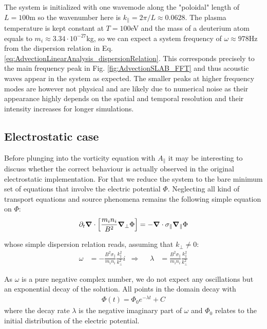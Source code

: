 The system is initialized with one wavemode along the "poloidal" length of $L=100$m so the wavenumber here is $k_\parallel = 2\pi / L \approx 0.0628$. The plasma temperature is kept constant at $T = 100$eV and the mass of a deuterium atom equals to $m_i \approx 3.34\cdot 10^{-27}$kg, so we can expect a system frequency of $\omega\approx 978$Hz from the dispersion relation in Eq. \ref{eq:AdvectionLinearAnalysis_dispersionRelation}. This corresponds precisely to the main frequency peak in Fig. \ref{fig:AdvectionSLAB_FFT} and thus acoustic waves appear in the system as expected. The smaller peaks at higher frequency modes are however not physical and are likely due to numerical noise as their appearance highly depends on the spatial and temporal resolution and their intensity increases for longer simulations. 


\subsection{Electrostatic case}
Before plunging into the vorticity equation with $A_\parallel$ it may be interesting to discuss whether the correct behaviour is actually observed in the original electrostatic implementation. For that we reduce the system to the bare minimum set of equations that involve the electric potential $\Phi$. Neglecting all kind of transport equations and source phenomena remains the following simple equation on $\Phi$: \\
\begin{equation}
		\partial_t\grad\cdot\left[\frac{m_in_i}{B^2}\grad_\perp\Phi\right] = -\grad\cdot\sigma_\parallel\grad_\parallel\Phi \label{eq:AdvectionSLAB_PHI}
\end{equation}

whose simple dispersion relation reads, assuming that $k_\perp \ne 0$:
\begin{align}
	\omega &= -\frac{B^2\sigma_\parallel}{m_in_i}\frac{k_\parallel^2}{k_\perp^2}i &\Rightarrow&& \lambda &= \frac{B^2\sigma_\parallel}{m_in_i}\frac{k_\parallel^2}{k_\perp^2}
\label{eq:AdvectionSLAB_dispersionRelation}
\end{align}

As $\omega$ is a pure negative complex number, we do not expect any oscillations but an exponential decay of the solution. All points in the domain decay with 
\begin{align}
	\Phi(t) = \Phi_0 e^{-\lambda t} + C \label{eq:electrostaticSLABdecay}
\end{align} 
where the decay rate $\lambda$ is the negative imaginary part of $\omega$ and $\Phi_0$ relates to the initial distribution of the electric potential.

